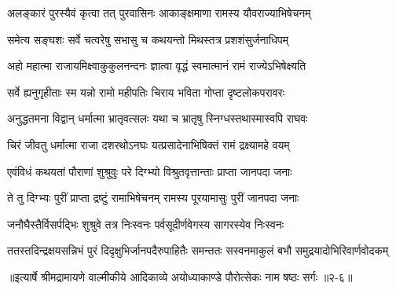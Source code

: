 \twolineshloka
{अलङ्कारं पुरस्यैवं कृत्वा तत् पुरवासिनः}
{आकाङ्क्षमाणा रामस्य यौवराज्याभिषेचनम्} %

\twolineshloka
{समेत्य सङ्घशः सर्वे चत्वरेषु सभासु च}
{कथयन्तो मिथस्तत्र प्रशशंसुर्जनाधिपम्} %

\twolineshloka
{अहो महात्मा राजायमिक्ष्वाकुकुलनन्दनः}
{ज्ञात्वा वृद्धं स्वमात्मानं रामं राज्येऽभिषेक्ष्यति} %

\twolineshloka
{सर्वे ह्यनुगृहीताः स्म यन्नो रामो महीपतिः}
{चिराय भविता गोप्ता दृष्टलोकपरावरः} %

\twolineshloka
{अनुद्धतमना विद्वान् धर्मात्मा भ्रातृवत्सलः}
{यथा च भ्रातृषु स्निग्धस्तथास्मास्वपि राघवः} %

\twolineshloka
{चिरं जीवतु धर्मात्मा राजा दशरथोऽनघः}
{यत्प्रसादेनाभिषिक्तं रामं द्रक्ष्यामहे वयम्} %

\twolineshloka
{एवंविधं कथयतां पौराणां शुश्रुवुः परे}
{दिग्भ्यो विश्रुतवृत्तान्ताः प्राप्ता जानपदा जनाः} %

\twolineshloka
{ते तु दिग्भ्यः पुरीं प्राप्ता द्रष्टुं रामाभिषेचनम्}
{रामस्य पूरयामासुः पुरीं जानपदा जनाः} %

\twolineshloka
{जनौघैस्तैर्विसर्पद्भिः शुश्रुवे तत्र निःस्वनः}
{पर्वसूदीर्णवेगस्य सागरस्येव निःस्वनः} %

\twolineshloka
{ततस्तदिन्द्रक्षयसन्निभं पुरं दिदृक्षुभिर्जानपदैरुपाहितैः}
{समन्ततः सस्वनमाकुलं बभौ समुद्रयादोभिरिवार्णवोदकम्} %


॥इत्यार्षे श्रीमद्रामायणे वाल्मीकीये आदिकाव्ये अयोध्याकाण्डे पौरोत्सेकः नाम षष्ठः सर्गः ॥२-६॥
